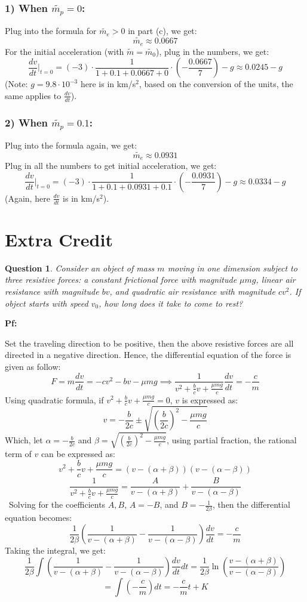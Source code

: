 \documentclass{article}
\newtheorem{question}{Question}
\begin{document}
\subsubsection*{1) When $\tilde{m_p}=0$:}
Plug into the formula for $\tilde{m_e}>0$ in part (c), we get:
$$\tilde{m_e} \approx 0.0667 $$
For the initial acceleration (with $\tilde{m} = \tilde{m_0}$), plug in the numbers, we get:
$$\frac{dv}{dt}\bigg|_{t=0} = (-3)\cdot\frac{1}{1+0.1+0.0667+0}\cdot\left(-\frac{0.0667}{7}\right)-g \approx 0.0245-g$$
(Note: $g=9.8\cdot 10^{-3}$ here is in km/s$^2$, based on the conversion of the units, the same applies to $\frac{dv}{dt}$).

\subsubsection*{2) When $\tilde{m_p}=0.1$:}
Plug into the formula again, we get:
$$\tilde{m_e} \approx 0.0931$$
Plug in all the numbers to get initial acceleration, we get:
$$\frac{dv}{dt}\bigg|_{t=0} = (-3)\cdot\frac{1}{1+0.1+0.0931+0.1}\cdot\left(-\frac{0.0931}{7}\right)-g \approx 0.0334-g$$
(Again, here $\frac{dv}{dt}$ is in km/s$^2$).


\break

\section{Extra Credit}%
\begin{question}\label{q6}
    Consider an object of mass $m$ moving in one dimension subject to three resistive forces: a constant frictional force with magnitude $\mu mg$, linear air resistance with magnitude $bv$, and quadratic air resistance with magnitude $cv^2$. If object starts with speed $v_0$, how long does it take to come to rest?
\end{question}

\textbf{Pf:}

Set the traveling direction to be positive, then the above resistive forces are all directed in a negative direction. Hence, the differential equation of the force is given as follow:
$$F = m\frac{dv}{dt} = - cv^2- bv-\mu mg  \implies \frac{1}{v^2+\frac{b}{c}v+\frac{\mu mg}{c}}\frac{dv}{dt}=-\frac{c}{m}$$
Using quadratic formula, if $v^2+\frac{b}{c}v+\frac{\mu mg}{c}=0$, $v$ is expressed as:
$$v=-\frac{b}{2c}\pm\sqrt{\left(\frac{b}{2c}\right)^2-\frac{\mu mg}{c}}$$
Which, let $\alpha=-\frac{b}{2c}$ and $\beta = \sqrt{(\frac{b}{2c})^2-\frac{\mu mg}{c}}$, using partial fraction, the rational term of $v$ can be expressed as:
$$v^2+\frac{b}{c}v+\frac{\mu mg}{c} = (v-(\alpha+\beta))(v-(\alpha-\beta))$$
$$\frac{1}{v^2+\frac{b}{c}v+\frac{\mu mg}{c}}=\frac{A}{v-(\alpha+\beta)}+\frac{B}{v-(\alpha-\beta)}$$\
Solving for the coefficients $A,B$, $A=-B$, and $B=-\frac{1}{2\beta}$, then the differential equation becomes:
$$\frac{1}{2\beta}\left(\frac{1}{v-(\alpha+\beta)}-\frac{1}{v-(\alpha-\beta)}\right)\frac{dv}{dt}=-\frac{c}{m}$$
Taking the integral, we get:
$$\frac{1}{2\beta}\int\left(\frac{1}{v-(\alpha+\beta)}-\frac{1}{v-(\alpha-\beta)}\right)\frac{dv}{dt}dt = \frac{1}{2\beta}\ln\left(\frac{v-(\alpha+\beta)}{v-(\alpha-\beta)}\right)$$
$$= \int\left(-\frac{c}{m}\right)dt = -\frac{c}{m}t+K$$
\end{document}
